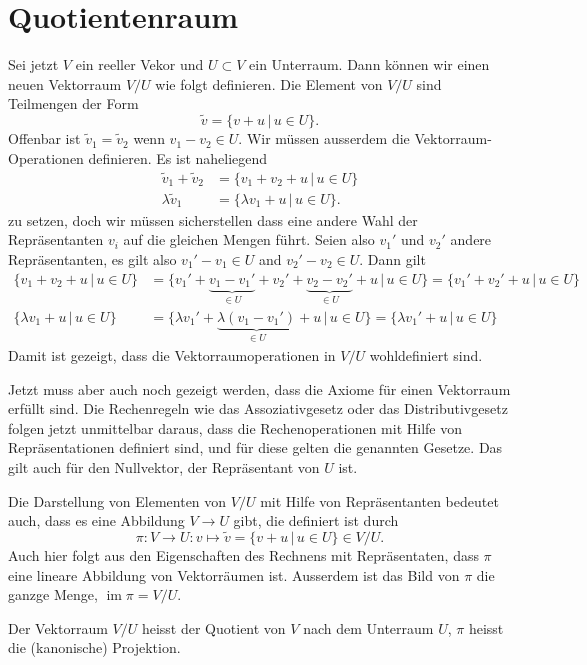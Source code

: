 \section{Quotientenraum}
Sei jetzt $V$ ein reeller Vekor und $U\subset V$ ein Unterraum.
Dann können wir einen neuen Vektorraum $V/U$ wie folgt definieren.
Die Element von $V/U$ sind Teilmengen der Form
\[
\tilde v = \{v+u\,|\, u\in U\}.
\]
Offenbar ist $\tilde v_1=\tilde v_2$ wenn $v_1-v_2\in U$.
Wir müssen ausserdem die Vektorraum-Operationen definieren.
Es ist naheliegend
\begin{align*}
\tilde v_1+\tilde v_2
&=
\{ v_1+v_2+u\,|\, u\in U\}
\\
\lambda \tilde v_1
&=
\{\lambda v_1+u\,|\, u\in U\}.
\end{align*}
zu setzen, doch wir müssen sicherstellen dass eine andere Wahl
der Repräsentanten $v_i$ auf die gleichen Mengen führt.
Seien also $v_1'$ und $v_2'$ andere Repräsentanten, es gilt also
$v_1'-v_1\in U$ and $v_2'-v_2\in U$.
Dann gilt
\begin{align*}
\{v_1 + v_2 + u\,|\, u\in U\}
&=
\{v_1' + \underbrace{v_1-v_1'}_{\displaystyle\in U}
+ v_2' + \underbrace{v_2-v_2'}_{\displaystyle\in U}
+ u\,|\, u\in U\} = \{v_1'+v_2'+u\,|\, u\in U\}
\\
\{\lambda v_1 + u\,|\, u\in U\}
&=
\{\lambda v_1' + \underbrace{\lambda(v_1-v_1')}_{\displaystyle \in U}+u
\,|\, u\in U\}
=
\{\lambda v_1' + u\,|\, u\in U\}
\end{align*}
Damit ist gezeigt, dass die Vektorraumoperationen in $V/U$ wohldefiniert
sind.

Jetzt muss aber auch noch gezeigt werden, dass die Axiome für einen
Vektorraum erfüllt sind.
Die Rechenregeln wie das Assoziativgesetz oder das Distributivgesetz
folgen jetzt unmittelbar daraus, dass die Rechenoperationen mit Hilfe
von Repräsentationen definiert sind, und für diese gelten die
genannten Gesetze.
Das gilt auch für den Nullvektor, der Repräsentant von $U$ ist.

Die Darstellung von Elementen von $V/U$ mit Hilfe von Repräsentanten
bedeutet auch, dass es eine Abbildung $V\to U$ gibt, die definiert
ist durch
\[
\pi \colon V\to U: v\mapsto \tilde v=\{v+u\,|\, u\in U\}\in V/U.
\]
Auch hier folgt aus den Eigenschaften des Rechnens mit Repräsentaten,
dass $\pi$ eine lineare Abbildung von Vektorräumen ist.
Ausserdem ist das Bild von $\pi$ die ganzge Menge,
$\operatorname{im}\pi = V/U$.

\begin{definition}
Der Vektorraum $V/U$ heisst der Quotient von $V$ nach dem Unterraum $U$,
$\pi$ heisst die (kanonische) Projektion.
\end{definition}

